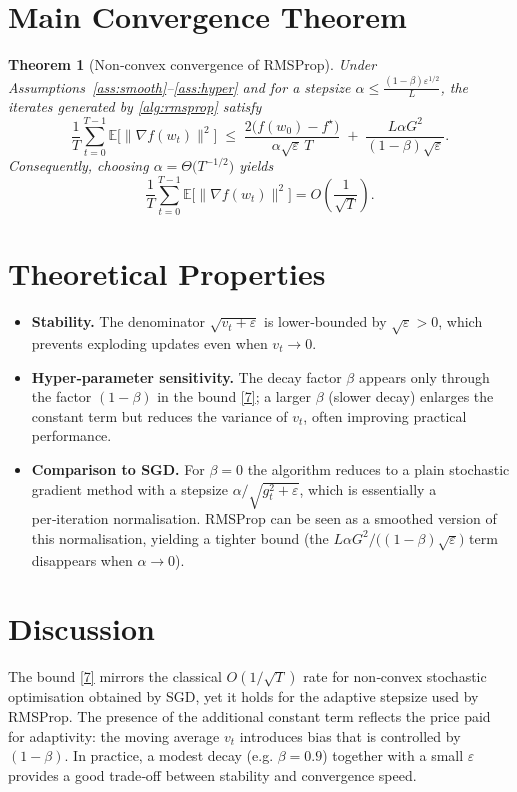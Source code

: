 \documentclass{article}
\newtheorem{theorem}{Theorem}
\newcommand{\E}{\mathbb{E}}
\begin{document}
\section*{Main Convergence Theorem}
\begin{theorem}[Non‑convex convergence of RMSProp]\label{thm:main}
Under Assumptions~\ref{ass:smooth}--\ref{ass:hyper} and for a
stepsize $\alpha\le \frac{(1-\beta)\varepsilon^{1/2}}{L}$,
the iterates generated by \eqref{alg:rmsprop} satisfy
\[
\frac{1}{T}\sum_{t=0}^{T-1}\E\!\bigl[\|\nabla f(w_{t})\|^{2}\bigr]
\;\le\;
\frac{2\bigl(f(w_{0})-f^{\star}\bigr)}{\alpha\sqrt{\varepsilon}\,T}
\;+\;
\frac{L\alpha G^{2}}{(1-\beta)\sqrt{\varepsilon}} .
\tag{7}
\]
Consequently, choosing $\alpha = \Theta\!\bigl(T^{-1/2}\bigr)$ yields
\[
\frac{1}{T}\sum_{t=0}^{T-1}\E\!\bigl[\|\nabla f(w_{t})\|^{2}\bigr]
= O\!\left(\frac{1}{\sqrt{T}}\right).
\]
\end{theorem}

\section*{Theoretical Properties}
\begin{itemize}[leftmargin=*]
\item \textbf{Stability.} The denominator $\sqrt{v_{t}+\varepsilon}$ is
lower‑bounded by $\sqrt{\varepsilon}>0$, which prevents exploding
updates even when $v_{t}\to 0$.
\item \textbf{Hyper‑parameter sensitivity.}
  The decay factor $\beta$ appears only through the factor
  $(1-\beta)$ in the bound \eqref{7}; a larger $\beta$ (slower decay)
  enlarges the constant term but reduces the variance of $v_{t}$,
  often improving practical performance.
\item \textbf{Comparison to SGD.}
  For $\beta=0$ the algorithm reduces to a plain stochastic gradient
  method with a stepsize $\alpha/\sqrt{g_{t}^{2}+\varepsilon}$,
  which is essentially a per‑iteration normalisation.  RMSProp can be
  seen as a smoothed version of this normalisation, yielding a tighter
  bound (the $L\alpha G^{2}/\!\bigl((1-\beta)\sqrt{\varepsilon}\bigr)$ term
  disappears when $\alpha\to 0$).
\end{itemize}

\section*{Discussion}
The bound \eqref{7} mirrors the classical $O(1/\sqrt{T})$ rate for
non‑convex stochastic optimisation obtained by SGD, yet it holds for the
adaptive stepsize used by RMSProp.  The presence of the additional
constant term reflects the price paid for adaptivity: the moving
average $v_{t}$ introduces bias that is controlled by $(1-\beta)$.  In
practice, a modest decay (e.g. $\beta=0.9$) together with a small
$\varepsilon$ provides a good trade‑off between stability and
convergence speed.
\end{document}
